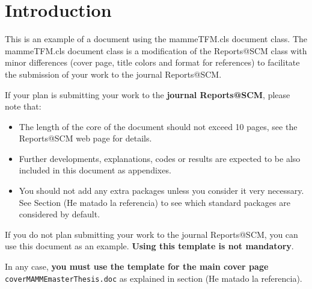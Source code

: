 \section{Introduction} \label{sec:introduction}

This is an example of a document using the mammeTFM.cls document class. The mammeTFM.cls document class is a modification of the Reports@SCM class with minor differences (cover page, title colors and format for references) to facilitate the submission of your work to the journal Reports@SCM.

If your plan is submitting your work to the \textbf{journal Reports@SCM}, please note that:
\begin{itemize}
	\item The length of the core of the document should not exceed 10 pages, see the Reports@SCM web page for details.
	\item Further developments, explanations, codes or results are expected to be also included in this document as appendixes.
	\item You should not add any extra packages unless you consider it very necessary. See Section (He matado la referencia) to see which standard packages  are considered by default.
\end{itemize}

If you do not plan submitting your work to the journal  Reports@SCM, you can use this document as an example. \textbf{Using this template is not mandatory}.

In any case, \textbf{you must use the template for the main cover page} \texttt{coverMAMMEmasterThesis.doc} as explained in section (He matado la referencia).